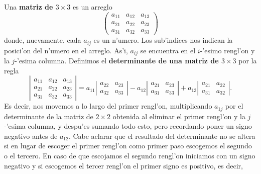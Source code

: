 \noindent Una {\bf matriz de $3\times 3$} es un arreglo 
$$
     \left (\begin{array}{ccc}
                 a_{11} &  a_{12} &a_{13}\\[1mm]
                 a_{21} &  a_{22}&a_{23}\\[1mm]
		 a_{31} &  a_{32}&a_{33}
              \end{array}\right )
$$
donde, nuevamente, cada $a_{ij}$ es un n'umero. Los sub'indices nos indican 
la po\-sici'on del n'umero en el arreglo.  As'i, $a_{ij}$ se encuentra en el 
$i$-'esimo
rengl'on y la $j$-'esima columna.  Definimos el {\bf determinante de una matriz de 
$3\times 3$} por la regla
$$
     \left |\begin{array}{ccc}
                 a_{11} &  a_{12} &a_{13}\\[1mm]
                 a_{21} &  a_{22}&a_{23}\\[1mm]
		 a_{31} &  a_{32}&a_{33}
              \end{array}\right |=
      a_{11} \left |\begin{array}{cc}
                  a_{22} &a_{23}\\[1mm]
                 a_{32} &  a_{33}
              \end{array}\right |-
      a_{12} \left |\begin{array}{cc}
                  a_{21} &a_{23}\\[1mm]
                 a_{31} &  a_{33}
              \end{array}\right | +
       a_{13} \left |\begin{array}{cc}
                  a_{21} &a_{22}\\[1mm]
                 a_{31} &  a_{32}
              \end{array}\right |. 	      	        	      	      
$$
Es decir, nos movemos a lo largo del primer rengl'on, multiplicando $a_{1j}$ por
el determinante de la matriz de $2\times 2$ obtenida al eliminar el primer
rengl'on y la $j$-'esima columna, y despu'es sumando todo esto, pero recordando
poner un signo negativo antes de $a_{12}$. Cabe aclarar que el resultado del
determinante no se altera si en lugar de escoger el primer rengl'on como primer
paso escogemos el segundo o el tercero. En caso de que escojamos el segundo
rengl'on iniciamos con un signo negativo y si escogemos el tercer rengl'on el
primer signo es positivo, es decir,
